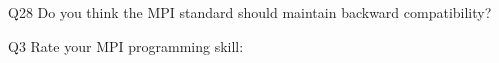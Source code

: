 \begin{description}%
\item{Q28} Do you think the MPI standard should maintain backward compatibility?%
\item{Q3} Rate your MPI programming skill:%
\end{description}%
